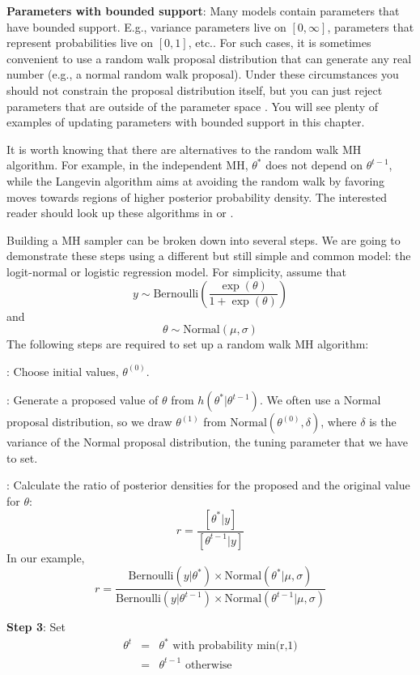 {\bf Parameters with bounded support}: Many models contain parameters
that have bounded support. E.g., variance parameters live on
$[0,\infty]$, parameters that represent probabilities live on $[0,1]$,
etc..  For such cases, it is sometimes convenient to use a random walk
proposal distribution that can generate any real number (e.g., a
normal random walk proposal). Under these circumstances you should not
constrain the proposal distribution itself, but you can just reject
parameters that are outside of the parameter space
\citep[sec. 6.4.1 in][]{robert_casella:2010}. You will see plenty of examples of
updating parameters with bounded support in this chapter.

It is worth
knowing that there are alternatives to the random walk MH algorithm. For
example, in the independent MH, $\theta^{*}$ does not depend on
$\theta^{t-1}$, while the Langevin algorithm \citep{roberts_etal:1998}
aims at avoiding the random walk by favoring moves towards regions of
higher posterior probability density. The interested reader should
look up these algorithms in \citet{robert_casella:2004} or
\citet{robert_casella:2010}.

Building a MH sampler can be broken down into several steps. We are going to demonstrate these steps using a different but still simple and common model: the logit-normal or logistic regression model. For simplicity, assume that
\[
y \sim \mbox{Bernoulli} \left(\frac{\exp(\theta)}{1+ \exp(\theta)}\right)
\]
and
\[
\theta \sim \mbox{Normal}(\mu, \sigma)
\]
The following steps are required to set up a random walk MH algorithm:

{: Choose initial values, $\theta^{(0)}$.}

{: Generate a proposed value of $\theta$ from $h(\theta^{*}|\theta^{t-1})$. }
We often use a Normal proposal distribution, so we draw $\theta^{(1)}$ from $\mbox{Normal}(\theta^{(0)}, \delta)$, where $\delta$ is the variance of the Normal proposal distribution, the tuning parameter that we have to set.

{: Calculate the ratio of posterior densities for the proposed and the original value for $\theta$: }
\[
r = \frac{[\theta^{*}|y]}  {[\theta^{t-1}|y]}
\]
In our example,
\[
r = \frac{\mbox{Bernoulli}(y|\theta^{*}) \times \mbox{Normal}(\theta^{*}|\mu, \sigma)} {\mbox{Bernoulli}(y|\theta^{t-1}) \times \mbox{Normal}(\theta^{t-1}|\mu, \sigma)}
\]


{\bf Step 3}: Set
\begin{eqnarray*}
\theta^t  &= &   \theta^{*} \mbox{ with probability min(r,1)}\\
	 & = & 	\theta^{t-1} \mbox{ otherwise }
\end{eqnarray*}

